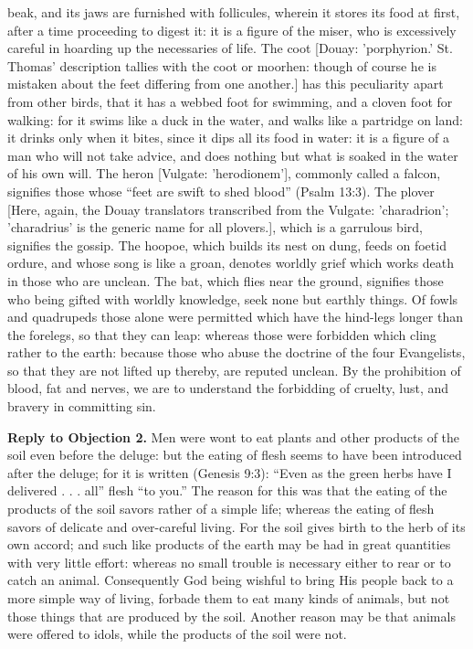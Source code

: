 beak, and its jaws are furnished with follicules, wherein it stores its food at first, after a time proceeding to digest it: it is a figure of the miser, who is excessively careful in hoarding up the necessaries of life. The coot [Douay: 'porphyrion.' St. Thomas' description tallies with the coot or moorhen: though of course he is mistaken about the feet differing from one another.] has this peculiarity apart from other birds, that it has a webbed foot for swimming, and a cloven foot for walking: for it swims like a duck in the water, and walks like a partridge on land: it drinks only when it bites, since it dips all its food in water: it is a figure of a man who will not take advice, and does nothing but what is soaked in the water of his own will. The heron [Vulgate: 'herodionem'], commonly called a falcon, signifies those whose ``feet are swift to shed blood'' (Psalm 13:3). The plover [Here, again, the Douay translators transcribed from the Vulgate: 'charadrion'; 'charadrius' is the generic name for all plovers.], which is a garrulous bird, signifies the gossip. The hoopoe, which builds its nest on dung, feeds on foetid ordure, and whose song is like a groan, denotes worldly grief which works death in those who are unclean. The bat, which flies near the ground, signifies those who being gifted with worldly knowledge, seek none but earthly things. Of fowls and quadrupeds those alone were permitted which have the hind-legs longer than the forelegs, so that they can leap: whereas those were forbidden which cling rather to the earth: because those who abuse the doctrine of the four Evangelists, so that they are not lifted up thereby, are reputed unclean. By the prohibition of blood, fat and nerves, we are to understand the forbidding of cruelty, lust, and bravery in committing sin.

\textbf{Reply to Objection 2.} Men were wont to eat plants and other products of the soil even before the deluge: but the eating of flesh seems to have been introduced after the deluge; for it is written (Genesis 9:3): ``Even as the green herbs have I delivered . . . all'' flesh ``to you.'' The reason for this was that the eating of the products of the soil savors rather of a simple life; whereas the eating of flesh savors of delicate and over-careful living. For the soil gives birth to the herb of its own accord; and such like products of the earth may be had in great quantities with very little effort: whereas no small trouble is necessary either to rear or to catch an animal. Consequently God being wishful to bring His people back to a more simple way of living, forbade them to eat many kinds of animals, but not those things that are produced by the soil. Another reason may be that animals were offered to idols, while the products of the soil were not.

